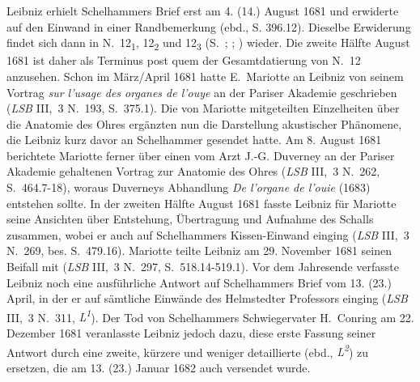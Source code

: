 Leibniz erhielt Schelhammers Brief erst am 4. (14.) August 1681 und erwiderte auf den %
Einwand in einer Randbemerkung (ebd., S. 396.12).
Dieselbe Erwiderung findet sich dann in N.~12\textsubscript{1}, 12\textsubscript{2} und 12\textsubscript{3} (S.~; ; %
) wieder.
Die zweite Hälfte August 1681 ist daher als Terminus post quem der Gesamtdatierung von N.~12 anzusehen.
\pend
\pstart%
Schon im März/April 1681 hatte E.~Mariotte\protect{} an Leibniz von seinem Vortrag \textit{sur l’usage des organes de l’ouye} an der Pariser Akademie\protect{} geschrieben (\cite{01209}\textit{LSB} III,~3 N.~193, S.~375.1).
Die von Mariotte mitgeteilten Einzelheiten über die Anatomie des Ohres ergänzten nun die Darstellung akustischer Phänomene, die Leibniz kurz davor %
an Schelhammer\protect{} gesendet hatte.
Am 8. August 1681 berich\-te\-te Mariotte ferner über einen vom Arzt J.-G. Duverney\protect{} an der Pariser Akademie gehaltenen Vortrag zur Anatomie des Ohres (\cite{01210}\textit{LSB} III,~3 N.~262, S.~464.7-18), woraus Duverneys Abhandlung \textit{De l'organe de l'ouie} (1683) entstehen sollte.\cite{01202}
In der zweiten Hälfte August 1681 fasste Leibniz für Mariotte seine Ansichten über Entstehung, Übertragung und Aufnahme des Schalls zusammen, wobei er auch auf Schelhammers \glqq Kissen\grqq-Einwand einging (\cite{01193}\textit{LSB} III,~3 N.~269, bes. S.~479.16).
Mariotte teilte Leibniz am 29. November 1681 seinen Beifall mit (\cite{01222}\textit{LSB} III,~3 N.~297, S.~518.14-519.1).
\pend
\pstart%
Vor dem Jahresende verfasste Leibniz noch eine ausführliche Antwort auf Schelhammers Brief vom 13. (23.) April, in der er auf sämtliche Einwände des Helmstedter Professors einging (\cite{01195}\textit{LSB} III,~3 N.~311, \textit{L\textsuperscript{1}}). Der Tod von Schelhammers Schwiegervater H.~Conring\protect{} am 22. %
Dezember 1681 veranlasste Leibniz jedoch dazu, diese erste Fassung seiner Antwort durch eine zweite, kürzere und weniger detaillierte (ebd., \textit{L\textsuperscript{2}}) zu ersetzen, die am 13. (23.) Januar 1682 auch versendet wurde. 
